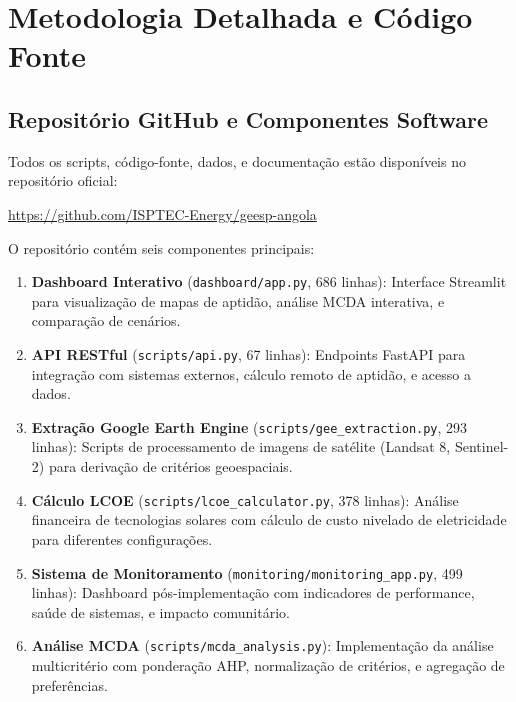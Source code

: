 \documentclass[12pt, a4paper]{article}
\begin{document}
{{{{{{{{{{{{\section{Metodologia Detalhada e Código Fonte}

\subsection{Repositório GitHub e Componentes Software}

Todos os scripts, código-fonte, dados, e documentação estão disponíveis no repositório oficial:

\begin{center}
\url{https://github.com/ISPTEC-Energy/geesp-angola}
\end{center}

O repositório contém seis componentes principais:

\begin{enumerate}
    \item \textbf{Dashboard Interativo} (\texttt{dashboard/app.py}, 686 linhas): Interface Streamlit para visualização de mapas de aptidão, análise MCDA interativa, e comparação de cenários.
    
    \item \textbf{API RESTful} (\texttt{scripts/api.py}, 67 linhas): Endpoints FastAPI para integração com sistemas externos, cálculo remoto de aptidão, e acesso a dados.
    
    \item \textbf{Extração Google Earth Engine} (\texttt{scripts/gee\_extraction.py}, 293 linhas): Scripts de processamento de imagens de satélite (Landsat 8, Sentinel-2) para derivação de critérios geoespaciais.
    
    \item \textbf{Cálculo LCOE} (\texttt{scripts/lcoe\_calculator.py}, 378 linhas): Análise financeira de tecnologias solares com cálculo de custo nivelado de eletricidade para diferentes configurações.
    
    \item \textbf{Sistema de Monitoramento} (\texttt{monitoring/monitoring\_app.py}, 499 linhas): Dashboard pós-implementação com indicadores de performance, saúde de sistemas, e impacto comunitário.
    
    \item \textbf{Análise MCDA} (\texttt{scripts/mcda\_analysis.py}): Implementação da análise multicritério com ponderação AHP, normalização de critérios, e agregação de preferências.
\end{enumerate}

}}}}}}}}}}}}
\end{document}
